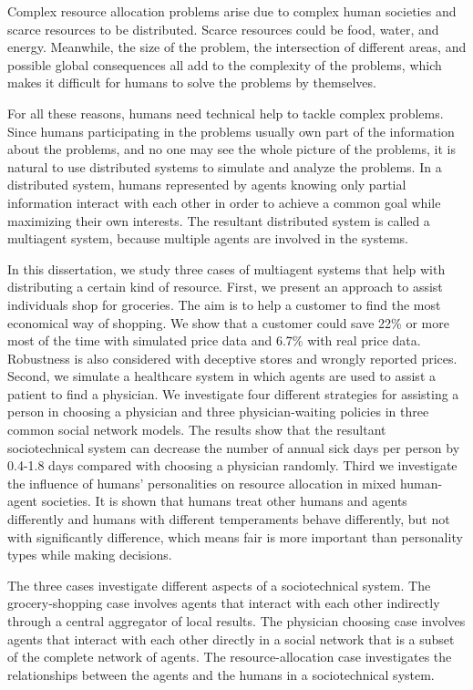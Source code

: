 Complex resource allocation problems arise due to complex human societies and scarce resources to be distributed. Scarce resources could be food, water, and energy. Meanwhile, the size of the problem, the intersection of different areas, and possible global consequences all add to the complexity of the problems, which makes it difficult for humans to solve the problems by themselves. 

For all these reasons, humans need technical help to tackle complex problems. Since humans participating in the problems usually own part of the information about the problems, and no one may see the whole picture of the problems, it is natural to use distributed systems to simulate and analyze the problems. In a distributed system, humans represented by agents knowing only partial information interact with each other in order to achieve a common goal while maximizing their own interests. The resultant distributed system is called a multiagent system, because multiple agents are involved in the systems.   

In this dissertation, we study three cases of multiagent systems that help with distributing a certain kind of resource. First, we present an approach to assist individuals shop for groceries. The aim is to help a customer to find the most economical way of shopping. We show that a customer could save 22\% or more most of the time with simulated price data and 6.7\% with real price data. Robustness is also considered with deceptive stores and wrongly reported prices. Second, we simulate a healthcare system in which agents are used to assist a patient to find a physician. We investigate four different strategies for assisting a person in choosing a physician and three physician-waiting policies in three common social network models. The results show that the resultant sociotechnical system can decrease the number of annual sick days per person by 0.4-1.8 days compared with choosing a physician randomly. Third we investigate the influence of humans' personalities on resource allocation in mixed human-agent societies. It is shown that humans treat other humans and agents differently and humans with different temperaments behave differently, but not with significantly difference, which means fair is more important than personality types while making decisions.   

The three cases investigate different aspects of a sociotechnical system. The grocery-shopping case involves agents that interact with each other indirectly through a central aggregator of local results. The physician choosing case involves agents that interact with each other directly in a social network that is a subset of the complete network of agents. The resource-allocation case investigates the relationships between the agents and the humans in a sociotechnical system.